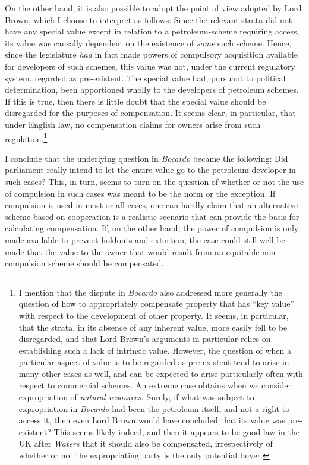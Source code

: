 On the other hand, it is also possible to adopt the point of view adopted by Lord Brown, which I choose to interpret as follows: Since the relevant strata did not have any special value except in relation to a petroleum-scheme requiring access, its value was causally dependent on the existence of \emph{some} such scheme. Hence, since the legislature {\it had} in fact made powers of compulsory acquisition available for developers of such schemes, this value was not, under the current regulatory system, regarded as pre-existent. The special value had, pursuant to political determination, been apportioned wholly to the developers of petroleum schemes. If this is true, then there is little doubt that the special value should be disregarded for the purposes of compensation. It seems clear, in particular, that under English law, no compensation claims for owners arise from such regulation.\footnote{I mention that the dispute in {\it Bocardo} also addressed more generally the question of how to appropriately compensate property that has ``key value'' with respect to the development of other property. It seems, in particular, that the strata, in its absence of any inherent value, more easily fell to be disregarded, and that Lord Brown's arguments in particular relies on establishing such a lack of intrinsic value. However, the question of when a particular aspect of value is to be regarded as pre-existent tend to arise in many other cases as well, and can be expected to arise particularly often with respect to commercial schemes. An extreme case obtains when we consider expropriation of \emph{natural resources}. Surely, if what was subject to expropriation in \emph{Bocardo} had been the petroleum itself, and not a right to access it, then even Lord Brown would have concluded that its value was pre-existent? This seems likely indeed, and then it appears to be good law in the UK after \emph{Waters} that it should also be compensated, irrespectively of whether or not the expropriating party is the only potential buyer.}

I conclude that the underlying question in {\it Bocardo} became the following: Did parliament really intend to let the entire value go to the petroleum-developer in such cases? This, in turn, seems to turn on the question of whether or not the use of compulsion in such cases was meant to be the norm or the exception. If compulsion is used in most or all cases, one can hardly claim that an alternative scheme based on cooperation is a realistic scenario that can provide the basis for calculating compensation. If, on the other hand, the power of compulsion is only made available to prevent holdouts and extortion, the case could still well be made that the value to the owner that would result from an equitable non-compulsion scheme should be compensated.

